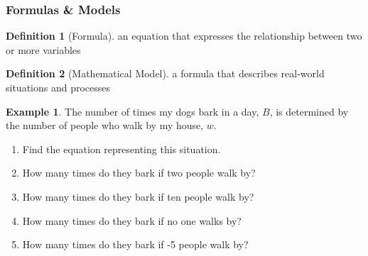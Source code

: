\documentclass[addpoints,12pt]{exam}
\theoremstyle{definition}
\newtheorem{example}{Example}[subsection]
\newtheorem{definition}{Definition}[subsection]
\begin{document}
\subsubsection*{Formulas \& Models}
\begin{definition}[Formula]
an equation that expresses the relationship between two or more variables
\end{definition}
\vspace{.1in}

\begin{definition}[Mathematical Model]
a formula that describes real-world situations and processes
\end{definition}
\vspace{.25in}

\begin{example}
The number of times my dogs bark in a day, $B$, is determined by the number of people who walk by my house, $w$.

\vspace{.1in}
\begin{enumerate}
\item Find the equation representing this situation.
\vspace{1in}
\item How many times do they bark if two people walk by?
\vspace{1in}
\item How many times do they bark if ten people walk by?
\vspace{1in}
\item How many times do they bark if no one walks by?
\vspace{1in}
\item How many times do they bark if -5 people walk by?
\end{enumerate}
\end{example}
\end{document}
